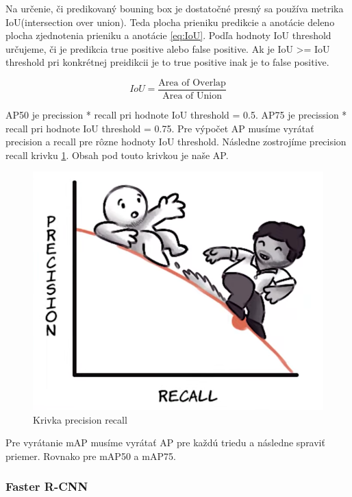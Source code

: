 Na určenie, či predikovaný bouning box je dostatočné presný sa používa metrika IoU(intersection over union). Teda plocha prieniku predikcie a anotácie deleno plocha zjednotenia prieniku a anotácie \ref{eq:IoU}. Podľa hodnoty IoU threshold určujeme, či je predikcia true positive alebo false positive. Ak je IoU >= IoU threshold pri konkrétnej preidikcii je to true positive inak je to false positive. 

\begin{equation}
IoU = \frac{\text{Area of Overlap}}{\text{Area of Union}} \label{eq:IoU}
\end{equation}

AP50 je precission * recall pri hodnote IoU threshold = 0.5. AP75 je precission * recall pri hodnote IoU threshold = 0.75. Pre výpočet AP musíme vyrátať precision a recall pre rôzne hodnoty IoU threshold. Následne zostrojíme precision recall krivku \ref{fig:image304}. Obsah pod touto krivkou je naše AP.


\begin{figure}[H]
\includegraphics[width=\textwidth]{images/precision_recall_curve.png}
\centering
\caption{Krivka precision recall}
\label{fig:image304}
\end{figure}

Pre vyrátanie mAP musíme vyrátať AP pre každú triedu a následne spraviť priemer. Rovnako pre mAP50 a mAP75.


\subsubsection{Faster R-CNN}


